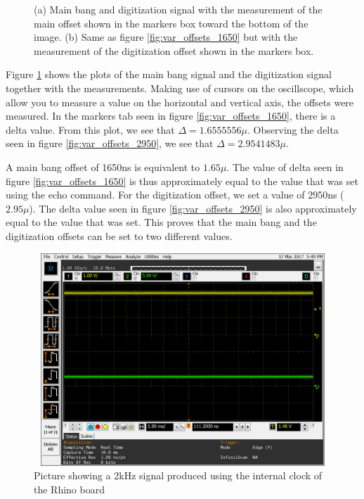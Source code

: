 \documentclass[12pt, a4paper]{article}
\begin{document}
\begin{figure}[t]
	\caption{(a) Main bang and digitization signal with the measurement of the main offset shown in the markers box toward the bottom of the image. (b) Same as figure \ref{fig:var_offsets_1650} but with the measurement of the digitization offset shown in the  markers box.}
	\label{fig:variable_offsets}
	\end{figure}
	
Figure \ref{fig:variable_offsets} shows the plots of the main bang signal and the digitization signal together with the measurements. Making use of cursors on the oscillscope, which allow you to measure a value on the horizontal and vertical axis, the offsets were measured. In the markers tab seen in figure \ref{fig:var_offsets_1650}, there is a delta value. From this plot, we see that \( \Delta = 1.6555556 \mu \). Observing the delta seen in figure \ref{fig:var_offsets_2950}, we see that \( \Delta = 2.9541483 \mu \). 


A main bang offset of 1650ns is equivalent to \( 1.65 \mu \). The value of delta seen in figure \ref{fig:var_offsets_1650} is thus approximately equal to the value that was set using the echo command. For the digitization offset, we set a value of 2950ns (\( 2.95 \mu \)). The delta value seen in figure \ref{fig:var_offsets_2950} is also approximately equal to the value that was set. This proves that the main bang and the digitization offsets can be set to two different values. 


	\begin{figure}[t]
		\centering
		\includegraphics[width=13cm, height=8cm]{2khz_mb_offset_500_ns}
		\caption{Picture showing a 2kHz signal produced using the internal clock of the Rhino board}
		\label{fig:2kHz_sig_int}
	\end{figure}
	
\end{document}
